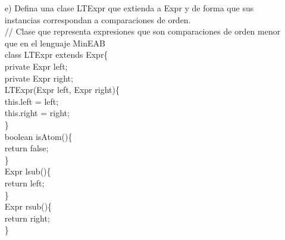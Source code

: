 \documentclass{article}
\begin{document}
\begin{itemize}
\begin{itemize}
            \item[e)] Defina una clase LTExpr que extienda a Expr y de forma que sus instancias correspondan a comparaciones de orden.\\

            // Clase que representa expresiones que son comparaciones de orden menor que en el lenguaje MinEAB\\
            class LTExpr extends Expr\{\\
            \hspace*{0.6cm}private Expr left;\\
            \hspace*{0.6cm}private Expr right;\\
            
            \hspace*{0.6cm}LTExpr(Expr left, Expr right)\{\\
            \hspace*{1.37cm}this.left = left;\\
            \hspace*{1.37cm}this.right = right;\\
            \hspace*{0.65cm}\}\\
            
            \hspace*{0.6cm}boolean isAtom()\{\\
            \hspace*{1.37cm}return false;\\
            \hspace*{0.6cm}\}\\
            
            \hspace*{0.6cm}Expr lsub()\{\\
            \hspace*{1.37cm}return left;\\
            \hspace*{0.6cm}\}\\
            
            \hspace*{0.6cm}Expr rsub()\{\\
            \hspace*{1.37cm}return right;\\
            \hspace*{0.6cm}\}\\
            

\end{itemize}
\end{itemize}
\end{document}
